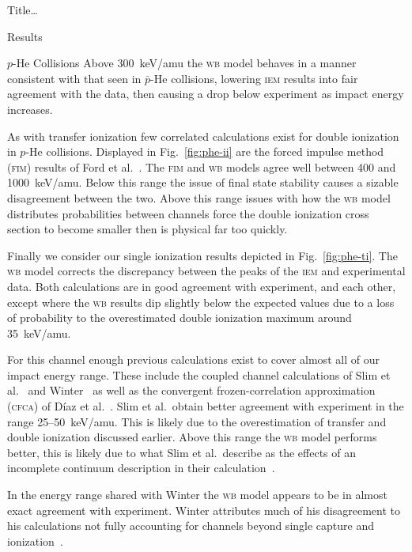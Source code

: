 \documentclass[letterpaper, 11 pt]{report}
\begin{document}
\begin{chapter}{ Title\dots \label{chap:p-he2p-he}}
\begin{section}{Results \label{sec:phe2p-res}}
\begin{subsection}{\texorpdfstring{$p$}{p}-He Collisions \label{sec:phe-res}}
         Above 300~keV/amu the \textsc{wb} model behaves in a manner consistent with that seen in
         $\bar{p}$-He collisions, lowering \textsc{iem} results into fair agreement with the data, then
         causing a drop below experiment as impact energy increases.
 
         As with transfer ionization few correlated calculations exist for double ionization in $p$-He
         collisions. Displayed in Fig.~\ref{fig:phe-ii} are the forced impulse method (\textsc{fim})
         results of Ford et al.~\cite{FR-94}. The \textsc{fim} and \textsc{wb} models agree well between
         400 and 1000~keV/amu. Below this range the issue of final state stability causes a sizable
         disagreement between the two. Above this range issues with how the \textsc{wb} model
         distributes probabilities between channels force  the double ionization cross section to become
         smaller then is physical far too quickly.

         Finally we consider our single ionization results depicted in Fig.~\ref{fig:phe-ti}. The
         \textsc{wb} model corrects the discrepancy between the peaks of the \textsc{iem} and
         experimental data. Both calculations are in good agreement with experiment, and each other,
         except where the \textsc{wb} results dip slightly below the expected values due to a loss of
         probability to the overestimated double ionization maximum around 35~keV/amu.

         For this channel enough previous calculations exist to cover almost all of our impact energy
         range. These include the coupled channel calculations of Slim et al.~\cite{SHBF-91} and
         Winter~\cite{Winter-91} as well as the convergent frozen-correlation approximation
         (\textsc{cfca}) of D\'{i}az et al.~\cite{DMS-00}. Slim et al.\ obtain better agreement with
         experiment in the range 25--50~keV/amu. This is likely due to the overestimation of transfer
         and double ionization discussed earlier. Above this range the \textsc{wb} model performs
         better, this is likely due to what Slim et al.\ describe as the effects of an incomplete
         continuum description in their calculation~\cite{SHBF-91}.
 
         In the energy range shared with Winter the \textsc{wb} model appears to be in almost exact
         agreement with experiment. Winter attributes much of his disagreement to his calculations not
         fully accounting for channels beyond single capture and ionization~\cite{Winter-91}.


\end{subsection}
\end{section}
\end{chapter}
\end{document}
